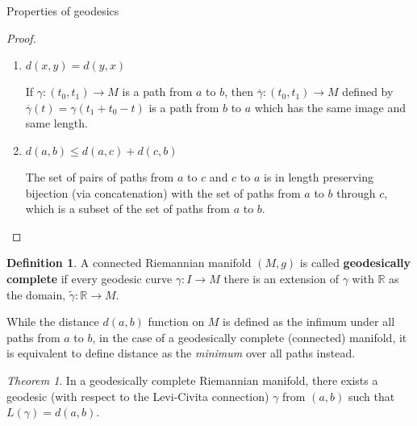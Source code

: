 \documentclass{article}
\newcommand{\fn}[3]{#1 \colon #2 \rightarrow #3}
\theoremstyle{definition}
\newtheorem{definition}{Definition}[section]
\theoremstyle{remark}
\newtheorem{theorem}{Theorem}[section]
\begin{document}
\begin{section}{Properties of geodesics}
\begin{proof}
\begin{enumerate}
      Choose some chart $(U, \varphi)$ around $p$ but not $q$, then in any
      compact set $K \subset U$ around $p$ there exists some $C \in (0, \infty)$ such that
      for all $x \in K$ and $v \in T_xK$, all vectors $||\varphi_*v|| \leq C ||v||_g$, which
      means that all curves in $K$ have length greater than $1/C$ times the
      length of their image under $\varphi$.

      Then let $R = \varphi^{-1}(B_\varepsilon(\varphi(p)))$ be the preimage of
      a small ball around $\varphi(p)$. By construction, $p$ is inside this
      region, $q$ is outside the region, and the distance to the boundary of the
      region is at least $\varepsilon$. Thus $d(p, q) \geq \epsilon$ by the
      Jordan Curve Theorem.

      $(\Longleftarrow)$ If $a = b$, the constant path
      $\gamma(t) = a = b$ has length $0$, and the length of a path is strictly non-negative because the integrand is nonnegative: $||v||_g \geq 0$.
      \item $d(x, y) = d(y, x)$

      If $\fn\gamma {(t_0, t_1)} M$ is a path from $a$ to $b$, then
      $\fn{\overline\gamma} {(t_0, t_1)} M$ defined by
      $\overline\gamma(t) = \gamma(t_1 + t_0 - t)$ is a path from $b$ to $a$
      which has the same image and same length.
      \item $d(a, b) \leq d(a, c) + d(c, b)$

      The set of pairs of paths from $a$ to $c$ and $c$ to $a$
      is in length preserving bijection (via concatenation) with
      the set of paths from $a$ to $b$ through $c$,
      which is a subset of
      the set of paths from $a$ to $b$.
    \end{enumerate}
  \end{proof}

  \begin{definition}
    A connected Riemannian manifold $(M, g)$ is called \textbf{geodesically complete}
    if every geodesic curve $\fn\gamma I M$ there is an extension of $\gamma$
    with $\mathbb R$ as the domain,
    $\fn {\widetilde\gamma} {\mathbb{R}} M$.
  \end{definition}

  While the distance $d(a, b)$ function on $M$ is defined as the
  infimum under all paths from $a$ to $b$, in the case of a geodesically
  complete (connected) manifold, it is equivalent to define distance as the
  \textit{minimum} over all paths instead.

  \begin{theorem}
    In a geodesically complete Riemannian manifold, there exists a geodesic
    (with respect to the Levi-Civita connection) $\gamma$ from $(a, b)$ such
    that $L(\gamma) = d(a, b)$.
  \end{theorem}


\end{section}
\end{document}
